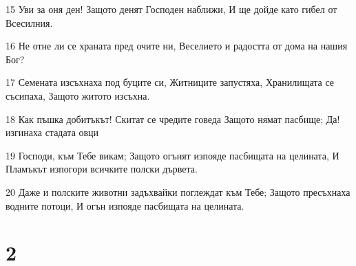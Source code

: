 \par 15 Уви за оня ден! Защото денят Господен наближи, И ще дойде като гибел от Всесилния.
\par 16 Не отне ли се храната пред очите ни, Веселието и радостта от дома на нашия Бог?
\par 17 Семената изсъхнаха под буците си, Житниците запустяха, Хранилищата се съсипаха, Защото житото изсъхна.
\par 18 Как пъшка добитъкът! Скитат се чредите говеда Защото нямат пасбище; Да! изгинаха стадата овци
\par 19 Господи, към Тебе викам; Защото огънят изпояде пасбищата на целината, И Пламъкът изпогори всичките полски дървета.
\par 20 Даже и полските животни задъхвайки поглеждат към Тебе; Защото пресъхнаха водните потоци, И огън изпояде пасбищата на целината.

\chapter{2}

